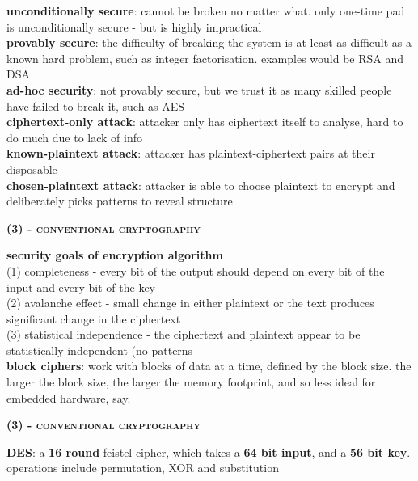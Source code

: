 \documentclass[a4paper]{article}
\begin{document}
\begin{multicols}{2}
\begin{framed}
	\noindent
	\textbf{unconditionally secure}: cannot be broken no matter what. only one-time pad is unconditionally secure - but is highly impractical\\
	\textbf{provably secure}: the difficulty of breaking the system is at least as difficult as a known hard problem, such as integer factorisation. examples would be RSA and DSA\\
	\textbf{ad-hoc security}: not provably secure, but we trust it as many skilled people have failed to break it, such as AES\\
	
	\noindent
	\textbf{ciphertext-only attack}: attacker only has ciphertext itself to analyse, hard to do much due to lack of info\\
	\textbf{known-plaintext attack}: attacker has plaintext-ciphertext pairs at their disposable\\
	\textbf{chosen-plaintext attack}: attacker is able to choose plaintext to encrypt and deliberately picks patterns to reveal structure
\end{framed}

\begin{framed}
	\begin{center}
		\textbf{\textsc{(3) - conventional cryptography}}
	\end{center}
	
	\noindent
	\textbf{security goals of encryption algorithm}\\
	(1) completeness - every bit of the output should depend on every bit of the input and every bit of the key\\
	(2) avalanche effect - small change in either plaintext or the text produces significant change in the ciphertext\\
	(3) statistical independence - the ciphertext and plaintext appear to be statistically independent (no patterns\\
	
	\noindent
	\textbf{block ciphers}: work with blocks of data at a time, defined by the block size. the larger the block size, the larger the memory footprint, and so less ideal for embedded hardware, say.
\end{framed}

\begin{framed}
	\begin{center}
		\textbf{\textsc{(3) - conventional cryptography}}
	\end{center}
	
	\noindent
	\textbf{DES}: a \textbf{16 round} feistel cipher, which takes a \textbf{64 bit input}, and a \textbf{56 bit key}. operations include permutation, XOR and substitution\\
	

\end{framed}
\end{multicols}
\end{document}
